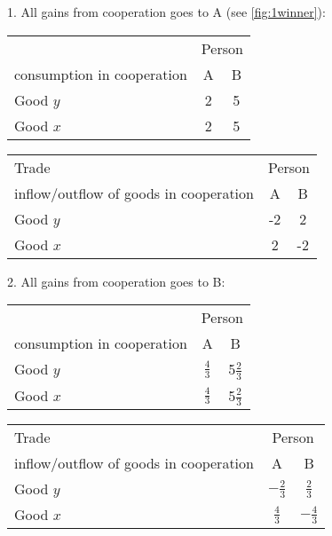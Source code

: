 1. All gains from cooperation goes to A (see \autoref{fig:1winner}):

\begin{minipage}[t]{0.4\textwidth}
	\begin{center}
		\begin{tabular}{lcc}\toprule
			&\multicolumn{2}{c}{Person} \\\cmidrule{2-3}
			consumption in cooperation	&A &B \\		\midrule
			Good $y$ & 2 & 5\\
			Good $x$ & 2 & 5 \\\bottomrule
		\end{tabular}
	\end{center}
\end{minipage}
\begin{minipage}[t]{0.59\textwidth}
	\begin{center}
		\begin{tabular}{lcc}\toprule
			Trade	&\multicolumn{2}{c}{Person} \\\cmidrule{2-3}
			inflow/outflow of goods in cooperation	&A &B \\		\midrule
			Good $y$ & -2 & 2\\
			Good $x$ & 2 & -2 \\\bottomrule
		\end{tabular}
	\end{center}
\end{minipage}

2. All gains from cooperation goes to B:

\begin{minipage}[t]{0.4\textwidth}
	\begin{center}
		\begin{tabular}{lcc}\toprule
			&\multicolumn{2}{c}{Person} \\\cmidrule{2-3}
			consumption in cooperation	&A &B \\		\midrule
			Good $y$ & $\frac{4}{3}$ & 5$\frac{2}{3}$\\
			Good $x$ & $\frac{4}{3}$ & 5$\frac{2}{3}$ \\\bottomrule
		\end{tabular}
	\end{center}
\end{minipage}
\begin{minipage}[t]{0.59\textwidth}
	\begin{center}
		\begin{tabular}{lcc}\toprule
			Trade	&\multicolumn{2}{c}{Person} \\\cmidrule{2-3}
			inflow/outflow of goods in cooperation	&A &B \\		\midrule
			Good $y$ & $-\frac{2}{3}$ & $\frac{2}{3}$\\
			Good $x$ & $\frac{4}{3}$ & $-\frac{4}{3}$ \\\bottomrule
		\end{tabular}
	\end{center}
\end{minipage}

